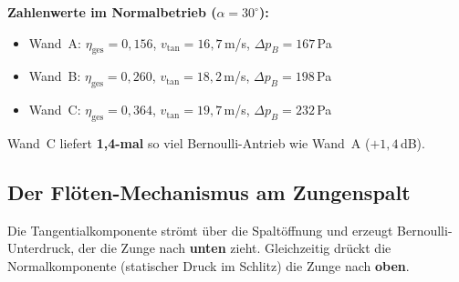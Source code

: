 \documentclass[11pt,a4paper]{article}
\begin{document}
\begin{table}[H]
\centering\small
{}
\caption{Bernoulli-Sog am Spalt für verschiedene Eintrittswinkel und Wandformen. Anteil bezogen auf $\Delta p_{B,\text{max}} = \tfrac{1}{2}\rho v_\text{Spalt}^2 = 499$\,Pa (wenn 100\,\% tangential wäre).}
\end{table}

\textbf{Zahlenwerte im Normalbetrieb ($\alpha = 30^\circ$):}
\begin{itemize}[leftmargin=5mm]
\item Wand~A: $\eta_\text{ges} = 0{,}156$, $v_\text{tan} = 16{,}7$\,m/s, $\Delta p_B = 167$\,Pa
\item Wand~B: $\eta_\text{ges} = 0{,}260$, $v_\text{tan} = 18{,}2$\,m/s, $\Delta p_B = 198$\,Pa
\item Wand~C: $\eta_\text{ges} = 0{,}364$, $v_\text{tan} = 19{,}7$\,m/s, $\Delta p_B = 232$\,Pa
\end{itemize}
Wand~C liefert \textbf{1{,}4-mal} so viel Bernoulli-Antrieb wie Wand~A ($+1{,}4$\,dB).

\subsection{Der Flöten-Mechanismus am Zungenspalt}

Die Tangentialkomponente strömt über die Spaltöffnung und erzeugt Bernoulli-Unterdruck, der die Zunge nach \textbf{unten} zieht. Gleichzeitig drückt die Normalkomponente (statischer Druck im Schlitz) die Zunge nach \textbf{oben}.
\end{document}

